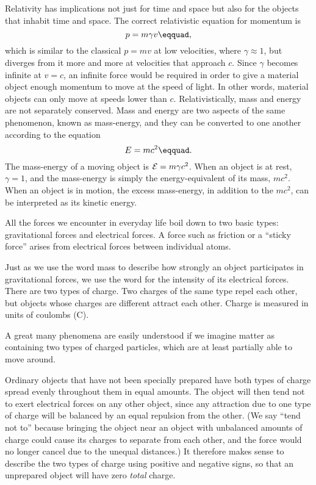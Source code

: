 Relativity has implications not just for time and space but also for the objects that
inhabit time and space. The correct relativistic equation for momentum is
\begin{equation*}
  p = m \gamma v\eqquad,
\end{equation*}
which is similar to the classical $p=mv$ at low velocities, where $\gamma\approx1$, but
diverges from it more and more at velocities that approach $c$.
Since $\gamma$ becomes infinite at $v=c$, an infinite force would be required in order
to give a material object enough momentum to move at the speed of light. In other words,
material objects can only move at speeds lower than $c$. Relativistically,
mass and energy are not separately conserved. Mass and energy are two aspects
of the same phenomenon, known as mass-energy, and they can be converted to one another
according to the equation
\begin{equation*}
  E=mc^2\eqquad.
\end{equation*}
The mass-energy of a moving object is $\mathcal{E}=m\gamma c^2$. When an object is at rest,
$\gamma=1$, and the mass-energy is simply the energy-equivalent of its mass, $mc^2$.
When an object is in motion, the excess mass-energy, in addition to the $mc^2$, can be interpreted as its
kinetic energy.


	All the forces we encounter in everyday life boil down to
	two basic types: gravitational forces and electrical forces.
	A force such as friction or a ``sticky force'' arises from
	electrical forces between individual atoms.
	
	Just as we use the word mass to describe how strongly an
	object participates in gravitational forces, we use the word
	 for the intensity of its electrical forces. There
	are two types of charge. Two charges of the same type repel
	each other, but objects whose charges are different attract
	each other. Charge is measured in units of coulombs (C).
	
	 A great many phenomena are
	easily understood if we imagine matter as containing two
	types of charged particles, which are at least partially
	able to move around.
	
	  Ordinary objects that have not
	been specially prepared have both types of charge spread
	evenly throughout them in equal amounts. The object will
	then tend not to exert electrical forces on any other
	object, since any attraction due to one type of charge will
	be balanced by an equal repulsion from the other. (We say
	``tend not to'' because bringing the object near an object
	with unbalanced amounts of charge could cause its charges to
	separate from each other, and the force would no longer
	cancel due to the unequal distances.) It therefore makes
	sense to describe the two types of charge using positive and
	negative signs, so that an unprepared object will have zero
	\emph{total} charge.
	
